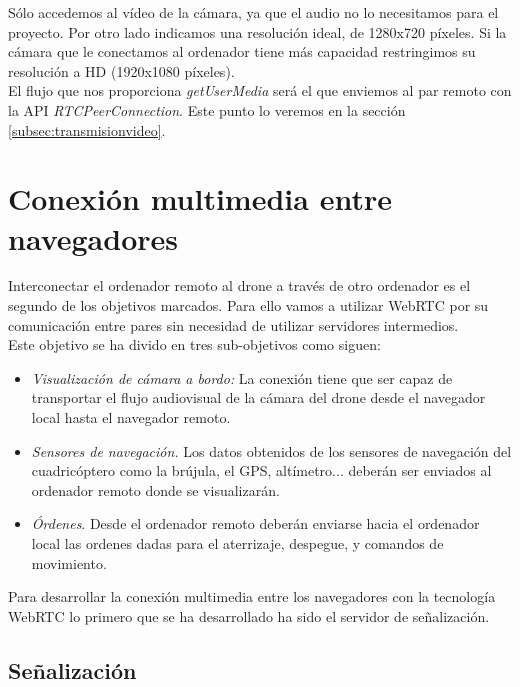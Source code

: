 Sólo accedemos al vídeo de la cámara, ya que el audio no lo necesitamos para el proyecto. Por otro lado indicamos una resolución ideal, de 1280x720 píxeles. Si la cámara que le conectamos al ordenador tiene más capacidad restringimos su resolución a HD (1920x1080 píxeles).\\

El flujo que nos proporciona \emph{getUserMedia} será el que enviemos al par remoto con la API \emph{RTCPeerConnection}. Este punto lo veremos en la sección \ref{subsec:transmisionvideo}.\\

\section{Conexión multimedia entre navegadores}

Interconectar el ordenador remoto al drone a través de otro ordenador es el segundo de los objetivos marcados. Para ello vamos a utilizar WebRTC por su comunicación entre pares sin necesidad de utilizar servidores intermedios.\\

Este objetivo se ha divido en tres sub-objetivos como siguen:
\begin{itemize}

\item \emph{Visualización de cámara a bordo:} La conexión tiene que ser capaz de transportar el flujo audiovisual de la cámara del drone desde el navegador local hasta el navegador remoto.

\item \emph{Sensores de navegación.} Los datos obtenidos de los sensores de navegación del cuadricóptero como la brújula, el GPS, altímetro... deberán ser enviados al ordenador remoto donde se visualizarán.

\item \emph{Órdenes}. Desde el ordenador remoto deberán enviarse hacia el ordenador local las ordenes dadas para el aterrizaje, despegue, y comandos de movimiento.

\end{itemize}

Para desarrollar la conexión multimedia entre los navegadores con la tecnología WebRTC lo primero que se ha desarrollado ha sido el servidor de señalización.\\

\subsection{Señalización}

